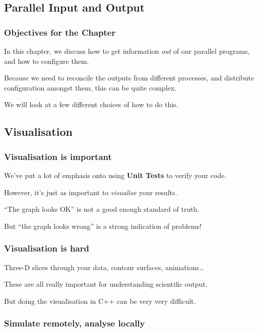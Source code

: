 \subsection{Parallel Input and Output}\label{parallel-input-and-output}

\subsubsection{Objectives for the
Chapter}\label{objectives-for-the-chapter}

In this chapter, we discuss how to get information \emph{out} of our
parallel programs, and how to configure them.

Because we need to reconcile the outputs from different processes, and
distribute configuration amongst them, this can be quite complex.

We will look at a few different choices of how to do this.

\subsection{Visualisation}\label{visualisation}

\subsubsection{Visualisation is
important}\label{visualisation-is-important}

We've put a lot of emphasis onto using \textbf{Unit Tests} to verify
your code.

However, it's just as important to \emph{visualise} your results.

``The graph looks OK'' is not a good enough standard of truth.

But ``the graph looks wrong'' is a strong indication of problems!

\subsubsection{Visualisation is hard}\label{visualisation-is-hard}

Three-D slices through your data, contour surfaces, animations\ldots{}

These are all really important for understanding scientific output.

But doing the visualisation in C++ can be very very difficult.

\subsubsection{Simulate remotely, analyse
locally}\label{simulate-remotely-analyse-locally}

